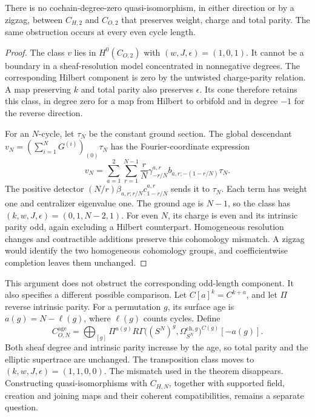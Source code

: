 \begin{theorem}
\label{thm:zbps-unshifted-mckay}
There is no cochain-degree-zero quasi-isomorphism, in either
direction or by a zigzag, between \(C_{H,2}\) and \(C_{O,2}\)
that preserves weight, charge and total parity.  The same
obstruction occurs at every even cycle length.
\end{theorem}
\begin{proof}
The class \(v\) lies in \(H^0(C_{O,2})\) with
\((w,J,\epsilon)=(1,0,1)\).  It cannot be a boundary in a
sheaf-resolution model concentrated in nonnegative degrees.
The corresponding Hilbert component is zero by the untwisted
charge-parity relation.  A map preserving \(k\) and total parity
also preserves \(\epsilon\).  Its cone therefore retains this
class, in degree zero for a map from Hilbert to orbifold and in
degree \(-1\) for the reverse direction.

For an \(N\)-cycle, let \(\tau_N\) be the constant ground section.
The global descendant \(v_N=(\sum_{i=1}^N G^{(i)})_{(0)}\tau_N\)
has the Fourier-coordinate expression
\[
 v_N=\sum_{a=1}^2\sum_{r=1}^{N-1}\frac rN
 \gamma^{a,r}_{-r/N}b_{a,r;-(1-r/N)}\tau_N.
\]
The positive detector
\((N/r)\beta_{a,r;r/N}c^{a,r}_{1-r/N}\) sends it to \(\tau_N\).
Each term has weight one and centralizer eigenvalue one.
The ground age is \(N-1\), so the class has
\((k,w,J,\epsilon)=(0,1,N-2,1)\).
For even \(N\), its charge is even and its intrinsic parity odd,
again excluding a Hilbert counterpart.  Homogeneous resolution
changes and contractible additions preserve this cohomology
mismatch.  A zigzag would identify the two homogeneous cohomology
groups, and coefficientwise completion leaves them unchanged.
\end{proof}

This argument does not obstruct the corresponding odd-length
component.  It also specifies a different possible comparison.
Let \(C[a]^k=C^{k+a}\), and let \(\Pi\) reverse intrinsic parity.
For a permutation \(g\), its surface age is
\(a(g)=N-\ell(g)\), where \(\ell(g)\) counts cycles.  Define
\[
 C_{O,N}^{\mathrm{age}}=
 \bigoplus_{[g]}\Pi^{a(g)}
 R\Gamma\bigl((S^N)^g,\Omega_{S^N}^{\mathrm{ch},g}\bigr)^{C(g)}
 [-a(g)].
\]
Both sheaf degree and intrinsic parity increase by the age, so
total parity and the elliptic supertrace are unchanged.
The transposition class moves to \((k,w,J,\epsilon)=(1,1,0,0)\).
The mismatch used in the theorem disappears.  Constructing
quasi-isomorphisms with \(C_{H,N}\), together with supported field,
creation and joining maps and their coherent compatibilities,
remains a separate question.

